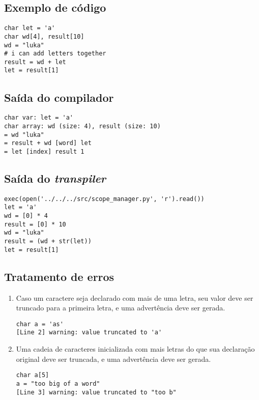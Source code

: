 \documentclass{sftex/sftex}
\newenvironment{smallenum}{
    \vspace{-1mm}
    \begin{enumerate}[label=\roman*.]
    \setlength{\parskip}{0pt}
    \setlength{\itemsep}{2pt}
}{
    \vspace{-2mm}
    \end{enumerate}
}
\begin{document}
\subsection{Exemplo de código}

\begin{verbatim}
char let = 'a'
char wd[4], result[10]
wd = "luka"
# i can add letters together
result = wd + let
let = result[1]
\end{verbatim}

\subsection{Saída do compilador}

\begin{verbatim}
char var: let = 'a'
char array: wd (size: 4), result (size: 10)
= wd "luka"
= result + wd [word] let
= let [index] result 1
\end{verbatim}

\subsection{Saída do \emph{transpiler}}

\begin{verbatim}
exec(open('../../../src/scope_manager.py', 'r').read())
let = 'a'
wd = [0] * 4
result = [0] * 10
wd = "luka"
result = (wd + str(let))
let = result[1]
\end{verbatim}

\subsection{Tratamento de erros}

\begin{smallenum}

\item Caso um caractere seja declarado com mais de uma letra, seu valor deve
    ser truncado para a primeira letra, e uma advertência deve ser gerada.

\begin{verbatim}
char a = 'as'
[Line 2] warning: value truncated to 'a'
\end{verbatim}

\item Uma cadeia de caracteres inicializada com mais letras do que sua
    declaração original deve ser truncada, e uma advertência deve ser gerada.

\begin{verbatim}
char a[5]
a = "too big of a word"
[Line 3] warning: value truncated to "too b"
\end{verbatim}

\end{smallenum}
\end{document}
